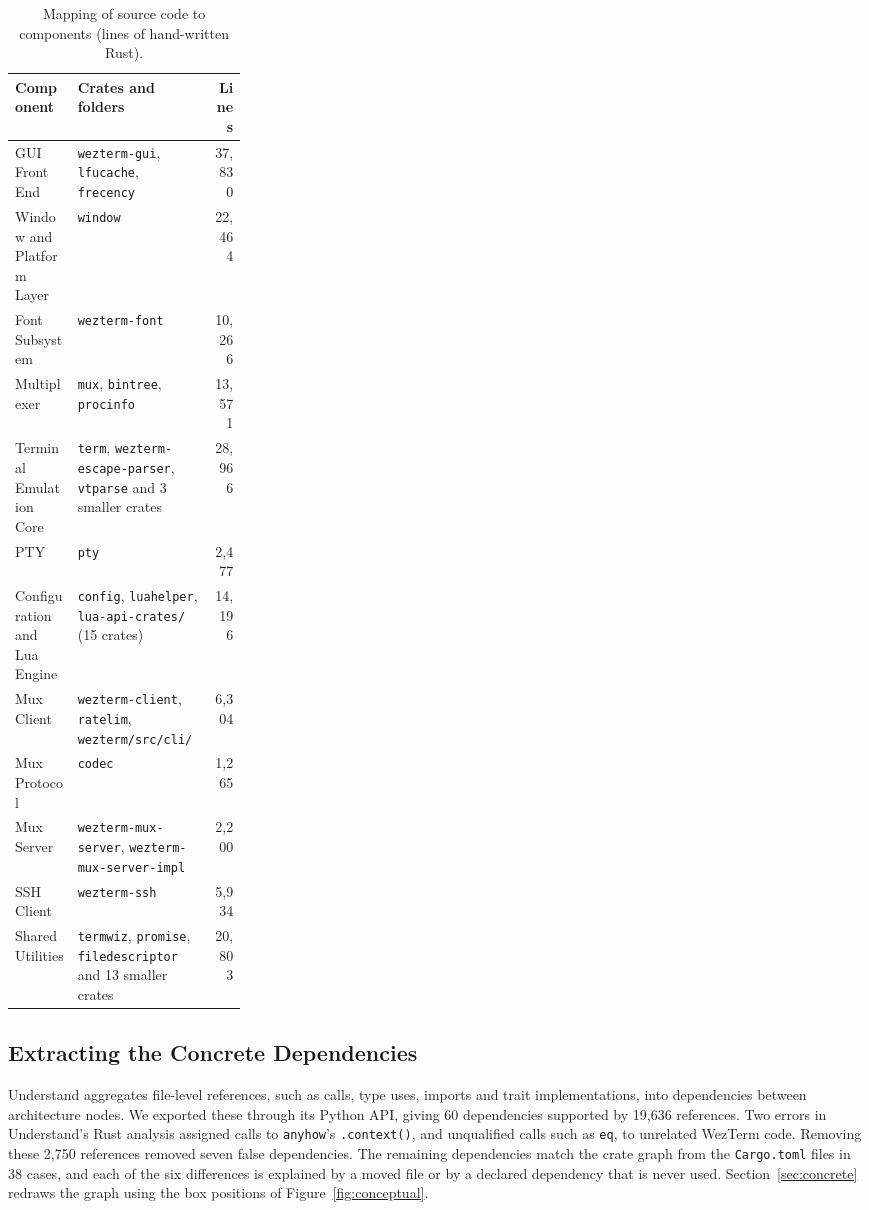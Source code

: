 \begin{table}[!htbp]
  \centering
  \caption{Mapping of source code to components (lines of hand-written Rust).}
  \label{tab:mapping}
  \footnotesize
  \begin{tabularx}{\linewidth}{@{}>{\raggedright\arraybackslash}p{0.27\linewidth}>{\raggedright\arraybackslash}Xr@{}}
    \toprule
    \textbf{Component} & \textbf{Crates and folders} & \textbf{Lines} \\
    \midrule
    GUI Front End & \texttt{wezterm-gui}, \texttt{lfucache}, \texttt{frecency} & 37,830 \\
    Window and Platform Layer & \texttt{window} & 22,464 \\
    Font Subsystem & \texttt{wezterm-font} & 10,266 \\
    Multiplexer & \texttt{mux}, \texttt{bintree}, \texttt{procinfo} & 13,571 \\
    Terminal Emulation Core & \texttt{term}, \texttt{wezterm-escape-parser}, \texttt{vtparse} and 3 smaller crates & 28,966 \\
    PTY & \texttt{pty} & 2,477 \\
    Configuration and Lua Engine & \texttt{config}, \texttt{luahelper}, \texttt{lua-api-crates/} (15 crates) & 14,196 \\
    Mux Client & \texttt{wezterm-client}, \texttt{ratelim}, \texttt{wezterm/src/cli/} & 6,304 \\
    Mux Protocol & \texttt{codec} & 1,265 \\
    Mux Server & \texttt{wezterm-mux-server}, \texttt{wezterm-mux-server-impl} & 2,200 \\
    SSH Client & \texttt{wezterm-ssh} & 5,934 \\
    Shared Utilities & \texttt{termwiz}, \texttt{promise}, \texttt{filedescriptor} and 13 smaller crates & 20,803 \\
    \bottomrule
  \end{tabularx}
\end{table}

\subsection{Extracting the Concrete Dependencies}
\label{sec:extracting}

Understand aggregates file-level references, such as calls, type uses, imports and trait implementations, into dependencies between architecture nodes. We exported these through its Python API, giving 60 dependencies supported by 19,636 references. Two errors in Understand's Rust analysis assigned calls to \texttt{anyhow}'s \texttt{.context()}, and unqualified calls such as \texttt{eq}, to unrelated WezTerm code. Removing these 2,750 references removed seven false dependencies. The remaining dependencies match the crate graph from the \texttt{Cargo.toml} files in 38 cases, and each of the six differences is explained by a moved file or by a declared dependency that is never used. Section~\ref{sec:concrete} redraws the graph using the box positions of Figure~\ref{fig:conceptual}. 

